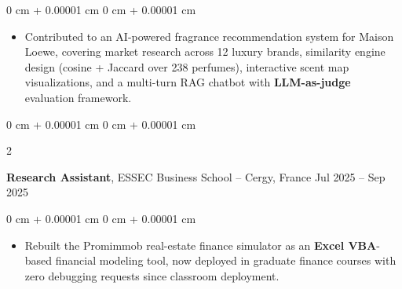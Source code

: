 \documentclass[10pt, letterpaper]{article}
\newenvironment{highlights}{
    \begin{itemize}[
        topsep=0.04 cm,
        parsep=0.02cm,
        partopsep=0pt,
        itemsep=0pt,
        leftmargin=0 cm + 10pt
    ]
}{
    \end{itemize}
} %
\newenvironment{onecolentry}{
    \begin{adjustwidth}{
        0 cm + 0.00001 cm
    }{
        0 cm + 0.00001 cm
    }
}{
    \end{adjustwidth}
} %
\newenvironment{twocolentry}[2][]{
    \onecolentry
    \def\secondColumn{#2}
    \setcolumnwidth{\fill, 3.8 cm}
    \begin{paracol}{2}
}{
    \switchcolumn \raggedleft \secondColumn
    \end{paracol}
    \endonecolentry
} %
\begin{document}
        \vspace{0.10 cm}
        \begin{onecolentry}
        \begin{highlights}
            \item Contributed to an AI-powered fragrance recommendation system for Maison Loewe, covering market research across 12 luxury brands, similarity engine design (cosine + Jaccard over 238 perfumes), interactive scent map visualizations, and a multi-turn RAG chatbot with \textbf{LLM-as-judge} evaluation framework.
        \end{highlights}
        \end{onecolentry}
        
    \vspace{0.2 cm}

        \begin{twocolentry}{
            Jul 2025 – Sep 2025
        }
            \textbf{Research Assistant}, ESSEC Business School -- Cergy, France\end{twocolentry}

        \vspace{0.10 cm}
        \begin{onecolentry}
            \begin{highlights}
                \item Rebuilt the Promimmob real-estate finance simulator as an \textbf{Excel VBA}-based financial modeling tool, now deployed in graduate finance courses with zero debugging requests since classroom deployment.
            \end{highlights}
        \end{onecolentry}
\end{document}
